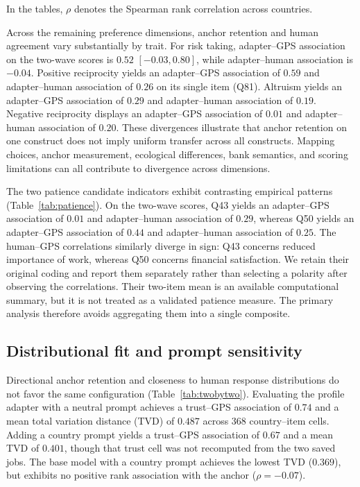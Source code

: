 In the tables, $\rho$ denotes the Spearman rank correlation across countries.


Across the remaining preference dimensions, anchor retention and human agreement vary substantially by trait. For risk taking, adapter--GPS association on the two-wave scores is $0.52$ $[-0.03, 0.80]$, while adapter--human association is $-0.04$. Positive reciprocity yields an adapter--GPS association of $0.59$ and adapter--human association of $0.26$ on its single item (Q81). Altruism yields an adapter--GPS association of $0.29$ and adapter--human association of $0.19$. Negative reciprocity displays an adapter--GPS association of $0.01$ and adapter--human association of $0.20$. These divergences illustrate that anchor retention on one construct does not imply uniform transfer across all constructs. Mapping choices, anchor measurement, ecological differences, bank semantics, and scoring limitations can all contribute to divergence across dimensions.


The two patience candidate indicators exhibit contrasting empirical patterns (Table~\ref{tab:patience}). On the two-wave scores, Q43 yields an adapter--GPS association of $0.01$ and adapter--human association of $0.29$, whereas Q50 yields an adapter--GPS association of $0.44$ and adapter--human association of $0.25$. The human--GPS correlations similarly diverge in sign: Q43 concerns reduced importance of work, whereas Q50 concerns financial satisfaction. We retain their original coding and report them separately rather than selecting a polarity after observing the correlations. Their two-item mean is an available computational summary, but it is not treated as a validated patience measure. The primary analysis therefore avoids aggregating them into a single composite.

\subsection{Distributional fit and prompt sensitivity}
Directional anchor retention and closeness to human response distributions do not favor the same configuration (Table~\ref{tab:twobytwo}). Evaluating the profile adapter with a neutral prompt achieves a trust--GPS association of $0.74$ and a mean total variation distance (TVD) of $0.487$ across 368 country--item cells. Adding a country prompt yields a trust--GPS association of $0.67$ and a mean TVD of $0.401$, though that trust cell was not recomputed from the two saved jobs. The base model with a country prompt achieves the lowest TVD ($0.369$), but exhibits no positive rank association with the anchor ($\rho = -0.07$).

